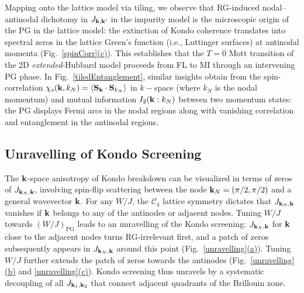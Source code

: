Mapping onto the lattice model via tiling, we observe that RG-induced nodal–antinodal dichotomy in $J_{{\bf k}, {\bf k}^\prime}$ in the impurity model is the microscopic origin of the PG in the lattice model: the extinction of Kondo coherence translates into spectral zeros in the lattice Green’s function (i.e., Luttinger surfaces) at antinodal momenta (Fig.~\hyperref[spinCorr]{\ref*{spinCorr}(c)}). This establishes that the $T=0$ Mott transition of the 2D \textit{extended}-Hubbard model proceeds from FL to MI through an intervening PG phase. In Fig.~\ref{tiledEntanglement}, similar insights obtain from the spin-correlation $\chi_s({\bf k},k_N) = \braket{{\bf S}_{\bf k}\cdot{\bf S}_{k_N}}$ in $k-$space (where $k_N$ is the nodal momentum) and mutual information $I_2({\bf k}:k_N)$ between two momentum states: the PG displays Fermi arcs in the nodal regions along with vanishing correlation and entanglement in the antinodal regions.


\subsection{Unravelling of Kondo Screening}
The ${\bf k}$-space anisotropy of Kondo breakdown can be visualized in terms of zeros of $J_{{\bf k}_N, {\bf k}}$, involving spin-flip scattering between the node ${\bf k}_N = (\pi/2, \pi/2)$  and a general wavevector ${\bf k}$.
For any $W/J$, the $\mathcal{C}_{4}$ lattice symmetry dictates that $J_{{\bf k}_N, {\bf k}}$ vanishes if ${\bf k}$ belongs to any of the antinodes or adjacent nodes. Tuning $W/J$ towards $(W/J)_{\text{PG}}$ leads to an unravelling of the Kondo screening: $J_{{\bf k}_N, {\bf k}}$ for ${\bf k}$ close to the adjacent nodes turns RG-irrelevant first, and a patch of zeros subsequently appears in $J_{{\bf k}_N, {\bf k}}$ around this point (Fig.~\hyperref[unravelling]{\ref*{unravelling}(a)}). Tuning $W/J$ further extends the patch of zeros towards the antinodes (Fig.~\hyperref[unravelling]{\ref*{unravelling}(b)} and \hyperref[unravelling]{\ref*{unravelling}(c)}). Kondo screening thus unravels by a systematic decoupling of all $J_{{\bf k}_1, {\bf k}_2}$ that connect adjacent quadrants of the Brillouin zone.   

